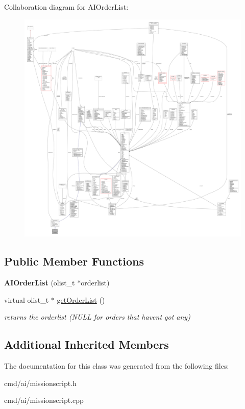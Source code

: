 Collaboration diagram for A\+I\+Order\+List\+:
\nopagebreak
\begin{figure}[H]
\begin{center}
\leavevmode
\includegraphics[width=350pt]{d4/d44/classAIOrderList__coll__graph}
\end{center}
\end{figure}
\subsection*{Public Member Functions}
\begin{DoxyCompactItemize}
\item 
{\bfseries A\+I\+Order\+List} (olist\+\_\+t $\ast$orderlist)\hypertarget{classAIOrderList_ae66d48a47dd30fc6e7194da6b115edf6}{}\label{classAIOrderList_ae66d48a47dd30fc6e7194da6b115edf6}

\item 
virtual olist\+\_\+t $\ast$ \hyperlink{classAIOrderList_aed700504c6eee6c983af8fb08fed00b2}{get\+Order\+List} ()\hypertarget{classAIOrderList_aed700504c6eee6c983af8fb08fed00b2}{}\label{classAIOrderList_aed700504c6eee6c983af8fb08fed00b2}

\begin{DoxyCompactList}\small\item\em returns the orderlist (N\+U\+LL for orders that haven\textquotesingle{}t got any) \end{DoxyCompactList}\end{DoxyCompactItemize}
\subsection*{Additional Inherited Members}


The documentation for this class was generated from the following files\+:\begin{DoxyCompactItemize}
\item 
cmd/ai/missionscript.\+h\item 
cmd/ai/missionscript.\+cpp\end{DoxyCompactItemize}
